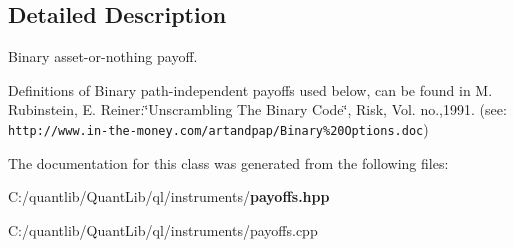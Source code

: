 \subsection{Detailed Description}
Binary asset-\/or-\/nothing payoff. 

Definitions of Binary path-\/independent payoffs used below, can be found in M. Rubinstein, E. Reiner\+:\char`\"{}\+Unscrambling The Binary Code\char`\"{}, Risk, Vol. no.,1991. (see\+: {\tt http\+://www.\+in-\/the-\/money.\+com/artandpap/\+Binary\%20\+Options.\+doc}) 

The documentation for this class was generated from the following files\+:\begin{DoxyCompactItemize}
\item 
C\+:/quantlib/\+Quant\+Lib/ql/instruments/{\bf payoffs.\+hpp}\item 
C\+:/quantlib/\+Quant\+Lib/ql/instruments/payoffs.\+cpp\end{DoxyCompactItemize}
